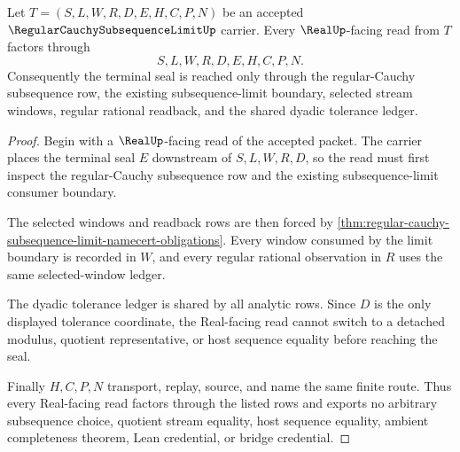 \begin{theorem}
\label{thm:regular-cauchy-subsequence-limit-real-seal-boundary}
Let $T=(S,L,W,R,D,E,H,C,P,N)$ be an accepted $\RegularCauchySubsequenceLimitUp$ carrier. Every $\RealUp$-facing read from $T$ factors through
$$
S,L,W,R,D,E,H,C,P,N.
$$
Consequently the terminal seal is reached only through the regular-Cauchy subsequence row, the existing subsequence-limit boundary, selected stream windows, regular rational readback, and the shared dyadic tolerance ledger.
\end{theorem}
\begin{proof}
Begin with a $\RealUp$-facing read of the accepted packet. The carrier places the terminal seal $E$ downstream of $S,L,W,R,D$, so the read must first inspect the regular-Cauchy subsequence row and the existing subsequence-limit consumer boundary.

The selected windows and readback rows are then forced by \autoref{thm:regular-cauchy-subsequence-limit-namecert-obligations}. Every window consumed by the limit boundary is recorded in $W$, and every regular rational observation in $R$ uses the same selected-window ledger.

The dyadic tolerance ledger is shared by all analytic rows. Since $D$ is the only displayed tolerance coordinate, the Real-facing read cannot switch to a detached modulus, quotient representative, or host sequence equality before reaching the seal.

Finally $H,C,P,N$ transport, replay, source, and name the same finite route. Thus every Real-facing read factors through the listed rows and exports no arbitrary subsequence choice, quotient stream equality, host sequence equality, ambient completeness theorem, Lean credential, or bridge credential.
\end{proof}


